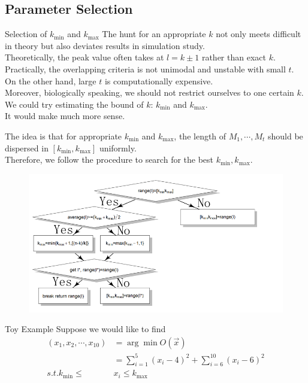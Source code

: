 \documentclass[xcolor=dvipsnames]{beamer}
\begin{document}
\subsection{Parameter Selection}
\begin{frame}{Selection of $k_{\min}$ and $k_{\max}$}
The hunt for an appropriate $k$ not only meets difficult in theory but also deviates results in simulation study.\\
Theoretically, the peak value often takes at $l=k\pm 1$ rather than exact $k$.\\
Practically, the overlapping criteria is not unimodal and unstable with small $t$.\\
On the other hand, large $t$ is computationally expensive.\\
Moreover, biologically speaking, we should not restrict ourselves to one certain $k$.\\
We could try estimating the bound of $k$: $k_{\min}$ and $k_{\max}$.\\
It would make much more sense.\\
\end{frame}
\begin{frame}
The idea is that for appropriate $k_{\min}$ and $k_{\max}$, the length of $M_1,\cdots,M_t$ should be dispersed in $[k_{\min},k_{\max}]$ uniformly.\\
Therefore, we follow the procedure to search for the best $k_{\min}, k_{\max}$.\\
\begin{figure}
\centering
\includegraphics[width=\linewidth]{selection.png}
\end{figure}
\end{frame}
\begin{frame}{Toy Example}
Suppose we would like to find
\begin{displaymath}
\begin{split}
(x_1,x_2,\cdots,x_{10})&=\arg\min O(\vec{x})\\
&=\sum_{i=1}^5(x_i-4)^2+\sum_{i=6}^{10}(x_i-6)^2\\
s.t. k_{\min}\leqslant &x_i\leqslant k_{\max}
\end{split}
\end{displaymath}
\end{frame}
\end{document}
